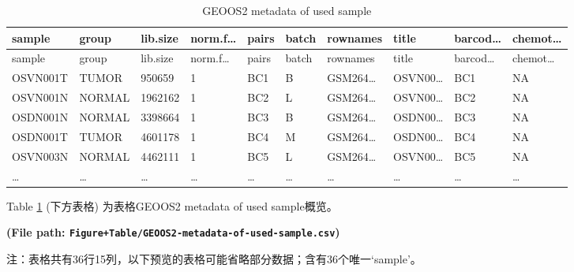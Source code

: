 \documentclass[
]{article}
\begin{document}
\begin{center}\vspace{1.5cm}\end{center}

\begin{center}\vspace{1.5cm}\end{center}

\begin{longtable}[]{@{}llllllllll@{}}
\caption{\label{tab:GEOOS2-metadata-of-used-sample}GEOOS2 metadata of used sample}\tabularnewline
\toprule
sample & group & lib.size & norm.f\ldots{} & pairs & batch & rownames & title & barcod\ldots{} & chemot\ldots{}\tabularnewline
\midrule
\endfirsthead
\toprule
sample & group & lib.size & norm.f\ldots{} & pairs & batch & rownames & title & barcod\ldots{} & chemot\ldots{}\tabularnewline
\midrule
\endhead
OSVN001T & TUMOR & 950659 & 1 & BC1 & B & GSM264\ldots{} & OSVN00\ldots{} & BC1 & NA\tabularnewline
OSVN001N & NORMAL & 1962162 & 1 & BC2 & L & GSM264\ldots{} & OSVN00\ldots{} & BC2 & NA\tabularnewline
OSDN001N & NORMAL & 3398664 & 1 & BC3 & B & GSM264\ldots{} & OSDN00\ldots{} & BC3 & NA\tabularnewline
OSDN001T & TUMOR & 4601178 & 1 & BC4 & M & GSM264\ldots{} & OSDN00\ldots{} & BC4 & NA\tabularnewline
OSVN003N & NORMAL & 4462111 & 1 & BC5 & L & GSM264\ldots{} & OSVN00\ldots{} & BC5 & NA\tabularnewline
\ldots{} & \ldots{} & \ldots{} & \ldots{} & \ldots{} & \ldots{} & \ldots{} & \ldots{} & \ldots{} & \ldots{}\tabularnewline
\bottomrule
\end{longtable}

Table \ref{tab:GEOOS2-metadata-of-used-sample} (下方表格) 为表格GEOOS2 metadata of used sample概览。

\textbf{(File path: \texttt{Figure+Table/GEOOS2-metadata-of-used-sample.csv})}

\begin{center}\begin{tcolorbox}[colback=gray!10, colframe=gray!50, width=0.9\linewidth, arc=1mm, boxrule=0.5pt]注：表格共有36行15列，以下预览的表格可能省略部分数据；含有36个唯一`sample'。
\end{tcolorbox}
\end{center}

\begin{center}\vspace{1.5cm}\end{center}
\end{document}
